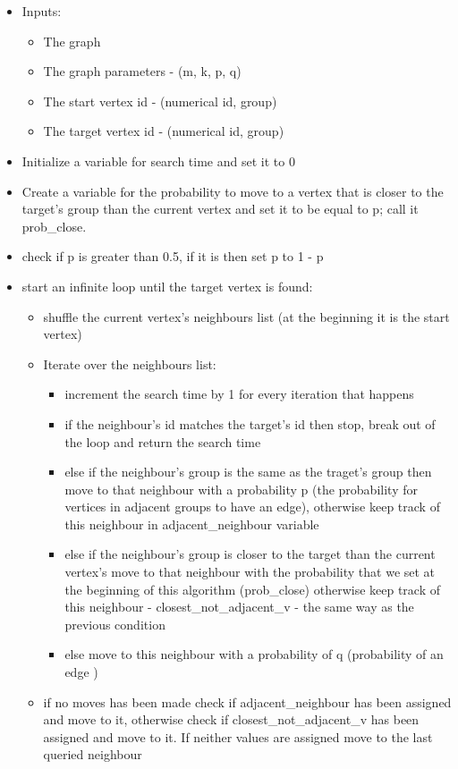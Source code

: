 \documentclass[11pt,a4paper,notitlepage]{article}
\begin{document}
\begin{itemize}
    \item Inputs:
    \begin{itemize}
        \item The graph
        \item The graph parameters - (m, k, p, q)
        \item The start vertex id - (numerical id, group)
        \item The target vertex id - (numerical id, group)
    \end{itemize}
    \item Initialize a variable for search time and set it to 0
    \item Create a variable for the probability to move to a vertex that is closer to the target's group than the current vertex and set it to be equal to p; call it prob\_close. 
    \item check if p is greater than 0.5, if it is then set p to 1 - p
    \item start an infinite loop until the target vertex is found:
    \begin{itemize}
        \item shuffle the current vertex's neighbours list (at the beginning it is the start vertex)
        \item Iterate over the neighbours list:
        \begin{itemize}
            \item increment the search time by 1 for every iteration that happens
            \item if the neighbour's id matches the target's id then stop, break out of the loop and return the search time
            \item else if the neighbour's group is the same as the traget's group then move to that neighbour with a probability p (the probability for vertices in adjacent groups to have an edge), otherwise keep track of this neighbour in adjacent\_neighbour variable 
            \item else if the neighbour's group is closer to the target than the current vertex's move to that neighbour with the probability that we set at the beginning of this algorithm (prob\_close) otherwise keep track of this neighbour - closest\_not\_adjacent\_v - the same way as the previous condition
            \item else move to this neighbour with a probability of q (probability of an edge )
        \end{itemize}
        \item if no moves has been made check if adjacent\_neighbour has been assigned and move to it, otherwise check if closest\_not\_adjacent\_v has been assigned and move to it. If neither values are assigned move to the last queried neighbour
    \end{itemize}
\end{itemize}
\end{document}
